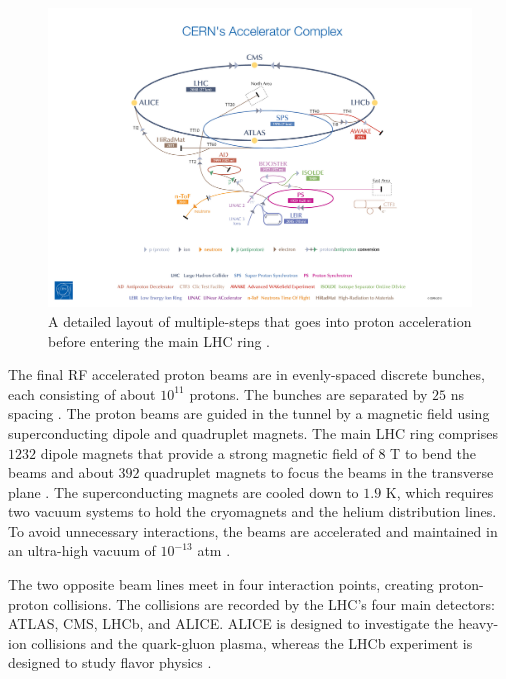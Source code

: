 \begin{figure}[!htb]
    \centering
    \includegraphics[width=1.2\linewidth]{figures/LHC/ProtonAccelerator.jpeg}
    \caption{ A detailed layout of multiple-steps that goes into proton acceleration before entering the main LHC ring \cite{ProtonAcclerator}.\label{fig:ProtonAcc}}
\end{figure}

The final RF accelerated proton beams are in evenly-spaced discrete bunches, each consisting of about $10^{11}$ protons. The bunches are separated by $25$ ns spacing \cite{LHCGuide}. The proton beams are guided in the tunnel by a magnetic field using superconducting dipole and quadruplet magnets. The main LHC ring comprises $1232$ dipole magnets that provide a strong magnetic field of $8$ T to bend the beams and about $392$ quadruplet magnets to focus the beams in the transverse plane \cite{LHCGuide}. The superconducting magnets are cooled down to $1.9$ K, which requires two vacuum systems to hold the cryomagnets and the helium distribution lines. To avoid unnecessary interactions, the beams are accelerated and maintained in an ultra-high vacuum of $10^{-13}$ atm \cite{LHCGuide}. 

The two opposite beam lines meet in four interaction points, creating proton-proton collisions. The collisions are recorded by the LHC's four main detectors: ATLAS, CMS, LHCb, and ALICE. ALICE is designed to investigate the heavy-ion collisions and the quark-gluon plasma, whereas the LHCb experiment is designed to study flavor physics \cite{LHCGuide}.